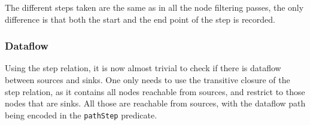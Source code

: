 The different steps taken are the same as in all the node filtering passes,
the only difference is that both the start and the end point of the step is 
recorded.

\subsubsection*{Dataflow}
Using the step relation, it is now almost trivial to check if there is dataflow 
between sources and sinks.
One only needs to use the transitive closure of the step relation, as it contains 
all nodes reachable from sources, and restrict to those nodes that are sinks.
All those are reachable from sources, with the dataflow path being encoded in the 
\texttt{pathStep} predicate.













